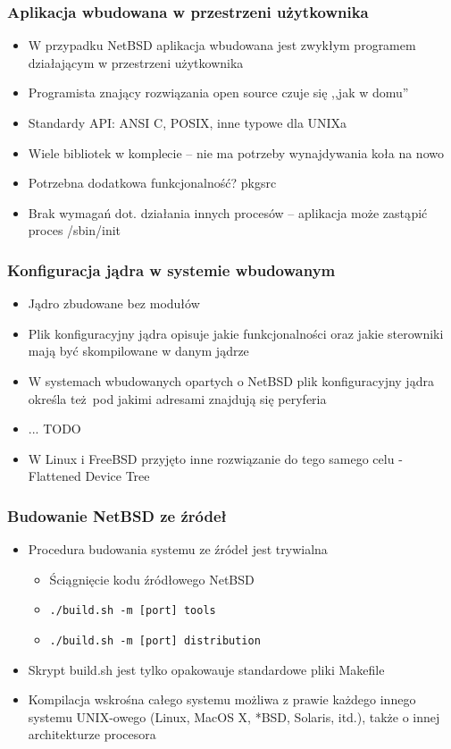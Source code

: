 \documentclass[dvipsnames,table]{beamer}
\begin{document}
\begin{frame}
\frametitle{Aplikacja wbudowana w przestrzeni użytkownika}
\begin{itemize}
	\item W przypadku NetBSD aplikacja wbudowana jest zwykłym programem działającym w przestrzeni użytkownika
	\item Programista znający rozwiązania open source czuje się ,,jak w domu''
	\item Standardy API: ANSI C, POSIX, inne typowe dla UNIXa
	\item Wiele bibliotek w komplecie -- nie ma potrzeby wynajdywania koła na nowo
	\item Potrzebna dodatkowa funkcjonalność? pkgsrc
	\item Brak wymagań dot. działania innych procesów -- aplikacja może zastąpić proces /sbin/init
\end{itemize}
\end{frame}

\begin{frame}
\frametitle{Konfiguracja jądra w systemie wbudowanym}
\begin{itemize}
	\item Jądro zbudowane bez modułów
	\item Plik konfiguracyjny jądra opisuje jakie funkcjonalności oraz jakie sterowniki mają być skompilowane w danym jądrze
	\item W systemach wbudowanych opartych o NetBSD plik konfiguracyjny jądra określa też pod jakimi adresami znajdują się peryferia
	\item ... TODO
	\item W Linux i FreeBSD przyjęto inne rozwiązanie do tego samego celu - Flattened Device Tree
\end{itemize}
\end{frame}

\begin{frame}
\frametitle{Budowanie NetBSD ze źródeł}
\begin{itemize}
	\item Procedura budowania systemu ze źródeł jest trywialna
	\begin{itemize}
		\item Ściągnięcie kodu źródłowego NetBSD
		\item \tt{./build.sh -m [port] tools}
		\item \tt{./build.sh -m [port] distribution}
	\end{itemize}
	\item Skrypt build.sh jest tylko opakowauje standardowe pliki Makefile
	\item Kompilacja wskrośna całego systemu możliwa z prawie każdego innego systemu UNIX-owego (Linux, MacOS X, *BSD, Solaris, itd.), także o innej architekturze procesora
\end{itemize}
\end{frame}
\end{document}
